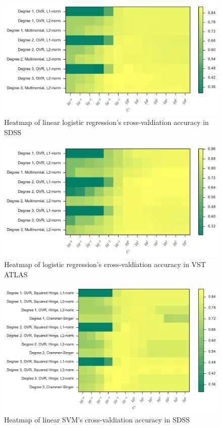 \begin{figure}[p]
	\centering
	\includegraphics[width=\textwidth]{figures/4_expt1/sdss_grid_logistic}
	\caption[Heatmap of logistic regression's cross-valdiation accuracy in SDSS]{
		Heatmap of linear logistic regression's cross-valdiation accuracy in SDSS}
	\label{fig:sdss_grid_logistic}
\end{figure}

\begin{figure}[p]
	\centering
	\includegraphics[width=\textwidth]{figures/4_expt1/vstatlas_grid_logistic}
	\caption[Heatmap of logistic regression's cross-valdiation accuracy in VST ATLAS]{
		Heatmap of logistic regression's cross-valdiation accuracy in VST ATLAS}
	\label{fig:vstatlas_grid_logistic}
\end{figure}

\begin{figure}[p]
	\centering
	\includegraphics[width=\textwidth]{figures/4_expt1/sdss_grid_poly}
	\caption[Heatmap of linear SVM's cross-valdiation accuracy in SDSS]{
		Heatmap of linear SVM's cross-valdiation accuracy in SDSS}
	\label{fig:sdss_grid_poly}
\end{figure}

